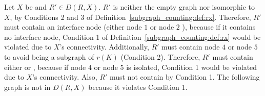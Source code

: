 \begin{example}
\begin{center}
\begin{tikzpicture}
        \end{tikzpicture}
    \end{center}
    Let $X$ be  and $R' \mathop{\in} D(R,X)$. 
    $R'$ is neither the empty graph nor isomorphic to $X$, by Conditions 2 and 3 of Definition~\ref{subgraph_counting:def:rx}. 
    Therefore, $R'$ must contain an interface node (either node $1$ 
     or node $2$
    ), because if it contains no interface node, Condition 1 of Definition~\ref{subgraph_counting:def:rx} would be violated due to $X$'s connectivity.
    Additionally, $R'$ must contain node $4$
     or node $5$
    to avoid being a subgraph of $r(K)$ (Condition 2). 
    Therefore, $R'$ must contain either 
      or 
    , because if node $4$
     or node $5$
    is isolated, Condition 1 would be violated due to $X$'s connectivity.
    Also, $R'$ must not contain 
    by Condition 1.
    The following graph
    is not in $D(R,X)$ because it violates Condition 1.

\end{example}
